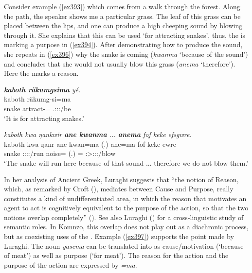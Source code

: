 Consider example (\ref{ex393}) which comes from a walk through the forest. Along the path, the speaker shows me a particular grass. The leaf of this grass can be placed between the lips, and one can produce a high cheeping sound by blowing through it. She explains that this can be used `for attracting snakes', thus, the  is marking a purpose in (\ref{ex394}). After demonstrating how to produce the sound, she repeats in (\ref{ex396}) why the snake is coming (\emph{kwanma} `because of the sound') and concludes that she would not usually blow this grass (\emph{anema} `therefore'). Here the   marks a reason.

\begin{exe}
\ex
\label{ex393}
\begin{xlist}
 	\ex \emph{\textbf{kaboth räkumgsima} yé.}\\
 	\gll kaboth räkumg-si=ma \\
 	snake attract-\Nmlz={\Char} \Tsg.\Masc:\Sbj:\Nonpast:\Ipfv/be\\ 
 	\trans `It is for attracting snakes.'
 	\label{ex394}

 	\ex \emph{kaboth kwa ŋankwir \textbf{ane kwanma} ... \textbf{anema} fof keke efsgwre.}\\
 	\gll kaboth kwa ŋanr ane kwan=ma (.) ane=ma fof keke ewre\\
 	snake {\Fut} \Stsg:\Sbj:\Nonpast:\Ipfv:\Venit/run {\Dem} noise={\Char} (.) \Dem={\Char} {\Emph} {\Neg} \Fpl:\Sbj>\Stpl:\Obj:\Nonpast:\Ipfv/blow\\
 	\trans `The snake will run here because of that sound ... therefore we do not blow them.'
 	\label{ex396}
\end{xlist}
\end{exe}

In her analysis of Ancient Greek, Luraghi suggests that ``the notion of Reason, which, as remarked by Croft (\citeyear{Croft:cogn}), mediates between Cause and Purpose, really constitutes a kind of undifferentiated area, in which the reason that motivates an agent to act is cognitively equivalent to the purpose of the action, so that the two notions overlap completely'' (\citeyear[46]{Luraghi:2003vi}). See also Luraghi (\citeyear{Luraghi:2001bv}) for a cross-linguistic study of semantic roles. In Komnzo, this overlap does not play out as a diachronic process, but as coexisting uses of the  . Example (\ref{ex397}) supports the point made by Luraghi. The noun \emph{yasema} can be translated into  as cause/motivation (`because of meat') as well as purpose (`for meat'). The reason for the action and the purpose of the action are expressed by \emph{=ma}.

